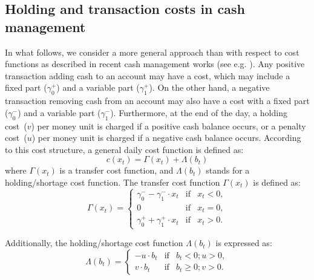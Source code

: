 \subsection{Holding and transaction costs in cash management\label{sec:costs}}

In what follows, we consider a more general approach than \cite{miller1966model} with respect to cost functions as described in recent cash management works (see e.g. \cite{gormley2007utility,salas2016multi}). Any positive transaction adding cash to an account may have a cost, which may include a fixed part  ($\gamma_0^{+}$) and a variable part ($\gamma_{1}^{+}$). On the other hand, a negative transaction removing cash from an account may also have a cost with a fixed part  ($\gamma_0^{-}$) and a variable part ($\gamma_{1}^{-}$). Furthermore, at the end of the day, a holding cost~($v$) per money unit is charged if a positive cash balance occurs, or a penalty cost~($u$) per money unit is charged if a negative cash balance occurs. According to this cost structure, a general daily cost function is defined as:
\begin{equation}
c(x_t)=\Gamma(x_t)+\Lambda(b_t)
\label{eq:DailyCostFunction}
\end{equation}
where $\Gamma(x_t)$ is a transfer cost function, and $\Lambda(b_t)$ stands for a holding/shortage cost function. The transfer cost function $\Gamma(x_t)$ is defined as:
\begin{equation}
\Gamma(x_t)=\left\{\begin{array}{lll}\gamma_{0}^{-}-\gamma_{1}^{-}\cdot x_t & \mbox{if} & x_t<0, \\ 0 & \mbox{if} & x_t=0,  \\\gamma_{0}^{+}+\gamma_{1}^{+} \cdot x_t & \mbox{if} & x_t>0.\end{array}\right.
\label{eq:TransferFunction}
\end{equation}

Additionally, the holding/shortage cost function $\Lambda(b_t)$ is expressed as:
\begin{equation}
\Lambda(b_t)=\left\{\begin{array}{lll}-u\cdot b_t & \mbox{if} & b_t<0;u>0, \\v\cdot b_t & \mbox{if} & b_t \geq 0;v>0.\end{array}\right.
\label{eq:HoldingShortageCost}
\end{equation}

